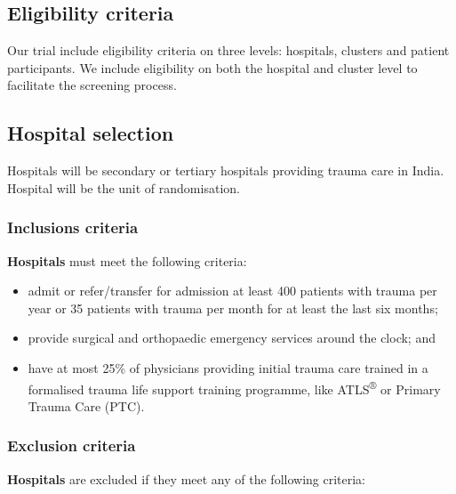 \documentclass[
]{scrartcl}
\providecommand{\tightlist}{%
  \setlength{\itemsep}{0pt}\setlength{\parskip}{0pt}}\usepackage{longtable,booktabs,array}
\begin{document}
\hypertarget{eligibility-criteria}{%
\subsection{Eligibility criteria}\label{eligibility-criteria}}

Our trial include eligibility criteria on three levels: hospitals,
clusters and patient participants. We include eligibility on both the
hospital and cluster level to facilitate the screening process.

\hypertarget{hospital-selection}{%
\subsection{Hospital selection}\label{hospital-selection}}

Hospitals will be secondary or tertiary hospitals providing trauma care
in India. Hospital will be the unit of randomisation.

\hypertarget{inclusions-criteria}{%
\subsubsection{Inclusions criteria}\label{inclusions-criteria}}

\textbf{Hospitals} must meet the following criteria:

\begin{itemize}
\tightlist
\item
  admit or refer/transfer for admission at least 400 patients with
  trauma per year or 35 patients with trauma per month for at least the
  last six months;
\item
  provide surgical and orthopaedic emergency services around the clock;
  and
\item
  have at most 25\% of physicians providing initial trauma care trained
  in a formalised trauma life support training programme, like
  ATLS\textsuperscript{®} or Primary Trauma Care (PTC).
\end{itemize}

\hypertarget{exclusion-criteria}{%
\subsubsection{Exclusion criteria}\label{exclusion-criteria}}

\textbf{Hospitals} are excluded if they meet any of the following
criteria:
\end{document}

